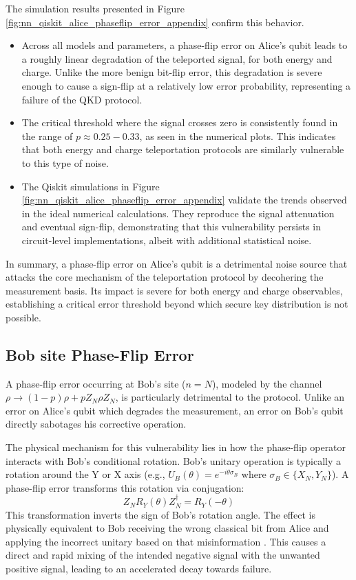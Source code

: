 The simulation results presented in Figure \ref{fig:nn_qiskit_alice_phaseflip_error_appendix} confirm this behavior. 
\begin{itemize}
    \item Across all models and parameters, a phase-flip error on Alice's qubit leads to a roughly linear degradation of the teleported signal, for both energy and charge. Unlike the more benign bit-flip error, this degradation is severe enough to cause a sign-flip at a relatively low error probability, representing a failure of the QKD protocol.
    
    \item The critical threshold where the signal crosses zero is consistently found in the range of $p \approx 0.25-0.33$, as seen in the numerical plots. This indicates that both energy and charge teleportation protocols are similarly vulnerable to this type of noise.
    
    \item The Qiskit simulations in Figure \ref{fig:nn_qiskit_alice_phaseflip_error_appendix} validate the trends observed in the ideal numerical calculations. They reproduce the signal attenuation and eventual sign-flip, demonstrating that this vulnerability persists in circuit-level implementations, albeit with additional statistical noise.
\end{itemize}
In summary, a phase-flip error on Alice's qubit is a detrimental noise source that attacks the core mechanism of the teleportation protocol by decohering the measurement basis. Its impact is severe for both energy and charge observables, establishing a critical error threshold beyond which secure key distribution is not possible.

\subsection{Bob site Phase-Flip Error}



A phase-flip error occurring at Bob's site ($n=N$), modeled by the channel $\rho \rightarrow (1-p)\rho + pZ_{N}\rho Z_{N}$, is particularly detrimental to the protocol. Unlike an error on Alice's qubit which degrades the measurement, an error on Bob's qubit directly sabotages his corrective operation.

The physical mechanism for this vulnerability lies in how the phase-flip operator interacts with Bob's conditional rotation. Bob's unitary operation is typically a rotation around the Y or X axis (e.g., $U_B(\theta) = e^{-i\theta\sigma_B}$ where $\sigma_B \in \{X_N, Y_N\}$). A phase-flip error transforms this rotation via conjugation:
\begin{equation*}
Z_N R_Y(\theta) Z_N^\dagger = R_Y(-\theta)
\end{equation*}
This transformation inverts the sign of Bob's rotation angle. The effect is physically equivalent to Bob receiving the wrong classical bit from Alice and applying the incorrect unitary based on that misinformation \cite{QKDbyQET}. This causes a direct and rapid mixing of the intended negative signal with the unwanted positive signal, leading to an accelerated decay towards failure.

